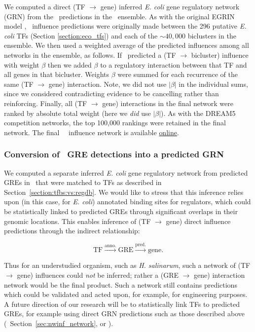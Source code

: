 We computed a direct (TF $\rightarrow$ gene) inferred {\it E. coli}
gene regulatory network (GRN) from the \nwinf~predictions in the
\egrine~ensemble. As with the original EGRIN model \cite{Bonneau2007},
\nwinf~influence predictions were originally made between the 296
putative {\it E. coli} TFs (Section \ref{section:eco_tfs}) and each of the
$\sim 40,000$ biclusters in the ensemble. We then used a weighted
average of the predicted influences among all networks in the
ensemble, as follows. If \nwinf~predicted a (TF $\rightarrow$
bicluster) influence with weight $\beta$ then we added $\beta$ to a
regulatory interaction between that TF and all genes in that
bicluster. Weights $\beta$ were summed for each recurrence of the same
(TF $\rightarrow$ gene) interaction. Note, we did not use $|\beta|$ in
the individual sums, since we considered contradicting evidence to be
cancelling rather than reinforcing. Finally, all (TF $\rightarrow$
gene) interactions in the final network were ranked by absolute total
weight (here we {\it did} use $|\beta|$). As with the DREAM5
competition networks, the top 100,000 rankings were retained in the
final network. The final \egrine~\nwinf~influence network is available
\href{http://egrin2.systemsbiology.net/}{online}.

\subsubsection{Conversion of \egrine~GRE detections into a predicted GRN}
\label{section:gre_grn_construction}

We computed a separate inferred {\it E. coli} gene regulatory network
from predicted GREs in \egrine\ that were matched to TFs as described
in Section~\ref{section:tfbs:vs:regdb}. We would like to stress that
this inference relies upon (in this case, for {\it E. coli}) annotated
binding sites for regulators, which could be statistically linked to
predicted GREs through significant overlaps in their genomic
locations. This enables inference of (TF $\rightarrow$ gene) direct
influence predictions through the indirect relationship: 

\begin{equation}
\label{eq:gre_network_relation}
\mathrm{TF} \overset{\mathrm{anno.}}{\rightarrow} \mathrm{GRE} \overset{\mathrm{pred.}}{\rightarrow} \mathrm{gene}.
\end{equation}

\noindent Thus for an understudied organism, such as {\it
  H. salinarum}, such a network of (TF $\rightarrow$ gene) influences
could {\it not} be inferred; rather a (GRE $\rightarrow$ gene)
interaction network would be the final product. Such a network still
contains predictions which could be validated and acted upon, for
example, for engineering purposes. A future direction of our research
will be to statistically link TFs to predicted GREs, for example using
direct GRN predictions such as those described above
(\eg\ Section~\ref{sec:nwinf_network}, or \cite{Marbach2012}).

